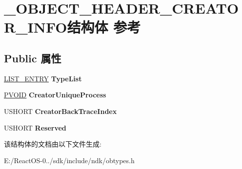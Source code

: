 \hypertarget{struct___o_b_j_e_c_t___h_e_a_d_e_r___c_r_e_a_t_o_r___i_n_f_o}{}\section{\+\_\+\+O\+B\+J\+E\+C\+T\+\_\+\+H\+E\+A\+D\+E\+R\+\_\+\+C\+R\+E\+A\+T\+O\+R\+\_\+\+I\+N\+F\+O结构体 参考}
\label{struct___o_b_j_e_c_t___h_e_a_d_e_r___c_r_e_a_t_o_r___i_n_f_o}
\subsection*{Public 属性}
\begin{DoxyCompactItemize}
\item 
\mbox{\label{struct___o_b_j_e_c_t___h_e_a_d_e_r___c_r_e_a_t_o_r___i_n_f_o_a16b80f53e5746874240362e57b299ed3}} 
\hyperlink{struct___l_i_s_t___e_n_t_r_y}{L\+I\+S\+T\+\_\+\+E\+N\+T\+RY} {\bfseries Type\+List}
\item 
\mbox{\label{struct___o_b_j_e_c_t___h_e_a_d_e_r___c_r_e_a_t_o_r___i_n_f_o_abec7ad43abf5eef0aefe3a0b82105d61}} 
\hyperlink{interfacevoid}{P\+V\+O\+ID} {\bfseries Creator\+Unique\+Process}
\item 
\mbox{\label{struct___o_b_j_e_c_t___h_e_a_d_e_r___c_r_e_a_t_o_r___i_n_f_o_a188faffa96e168fe125d4a9b0dde9075}} 
U\+S\+H\+O\+RT {\bfseries Creator\+Back\+Trace\+Index}
\item 
\mbox{\label{struct___o_b_j_e_c_t___h_e_a_d_e_r___c_r_e_a_t_o_r___i_n_f_o_a35149ab13714a14bd1e05822a1f60231}} 
U\+S\+H\+O\+RT {\bfseries Reserved}
\end{DoxyCompactItemize}


该结构体的文档由以下文件生成\+:\begin{DoxyCompactItemize}
\item 
E\+:/\+React\+O\+S-\/0../sdk/include/ndk/obtypes.\+h\end{DoxyCompactItemize}
